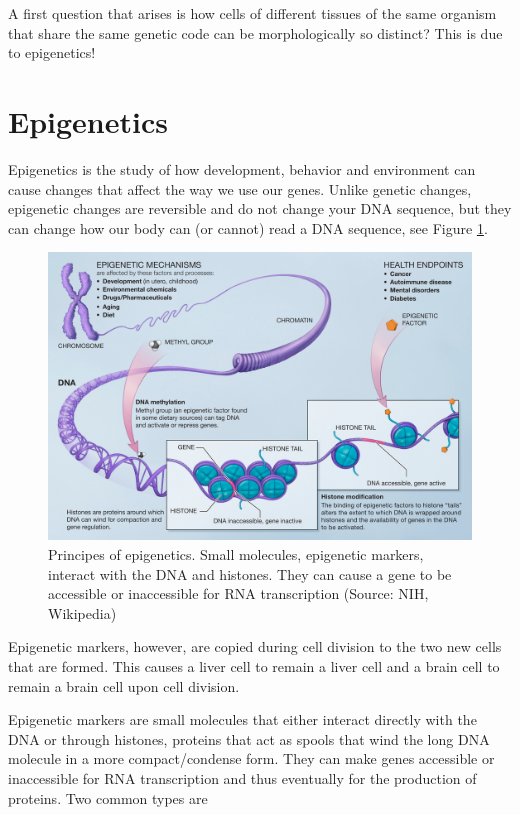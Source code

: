 \documentclass[
  11pt,
]{book}
\begin{document}
A first question that arises is how cells of different tissues of the same organism that share the same genetic code can be morphologically so distinct? This is due to epigenetics!

\hypertarget{epigenetics}{%
\section{Epigenetics}\label{epigenetics}}

Epigenetics is the study of how development, behavior and environment can cause changes that affect the way we use our genes. Unlike genetic changes, epigenetic changes are reversible and do not change your DNA sequence, but they can change how our body can (or cannot) read a DNA sequence, see Figure \ref{fig:epigenetics}.

\begin{figure}

{\centering \includegraphics[width=1\linewidth]{./figs/Epigenetic_mechanisms} 

}

\caption{Principes of epigenetics. Small molecules, epigenetic markers, interact with the DNA and histones. They can cause a gene to be accessible or inaccessible for RNA transcription (Source: NIH, Wikipedia)}\label{fig:epigenetics}
\end{figure}

Epigenetic markers, however, are copied during cell division to the two new cells that are formed. This causes a liver cell to remain a liver cell and a brain cell to remain a brain cell upon cell division.

Epigenetic markers are small molecules that either interact directly with the DNA or through histones, proteins that act as spools that wind the long DNA molecule in a more compact/condense form.
They can make genes accessible or inaccessible for RNA transcription and thus eventually for the production of proteins. Two common types are
\end{document}
